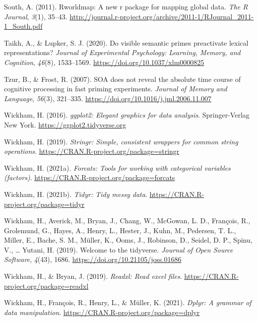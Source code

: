 \documentclass[
  english,
  man,floatsintext]{apa6}
\newlength{\cslhangindent}
\newlength{\cslentryspacingunit} %
\newenvironment{CSLReferences}[2] %
 {%
  \setlength{\parindent}{0pt}
  \ifodd #1
  \let\oldpar\par
  \def\par{\hangindent=\cslhangindent\oldpar}
  \fi
  \setlength{\parskip}{#2\cslentryspacingunit}
 }%
 {}
\begin{document}
\begin{CSLReferences}{1}{0}
\leavevmode{}%
South, A. (2011). Rworldmap: A new r package for mapping global data. \emph{The R Journal}, \emph{3}(1), 35--43. \url{http://journal.r-project.org/archive/2011-1/RJournal_2011-1_South.pdf}

\leavevmode{}%
Taikh, A., \& Lupker, S. J. (2020). Do visible semantic primes preactivate lexical representations? \emph{Journal of Experimental Psychology: Learning, Memory, and Cognition}, \emph{46}(8), 1533--1569. \url{https://doi.org/10.1037/xlm0000825}

\leavevmode{}%
Tzur, B., \& Frost, R. (2007). {SOA} does not reveal the absolute time course of cognitive processing in fast priming experiments. \emph{Journal of Memory and Language}, \emph{56}(3), 321--335. \url{https://doi.org/10.1016/j.jml.2006.11.007}

\leavevmode{}%
Wickham, H. (2016). \emph{ggplot2: Elegant graphics for data analysis}. Springer-Verlag New York. \url{https://ggplot2.tidyverse.org}

\leavevmode{}%
Wickham, H. (2019). \emph{Stringr: Simple, consistent wrappers for common string operations}. \url{https://CRAN.R-project.org/package=stringr}

\leavevmode{}%
Wickham, H. (2021a). \emph{Forcats: Tools for working with categorical variables (factors)}. \url{https://CRAN.R-project.org/package=forcats}

\leavevmode{}%
Wickham, H. (2021b). \emph{Tidyr: Tidy messy data}. \url{https://CRAN.R-project.org/package=tidyr}

\leavevmode{}%
Wickham, H., Averick, M., Bryan, J., Chang, W., McGowan, L. D., François, R., Grolemund, G., Hayes, A., Henry, L., Hester, J., Kuhn, M., Pedersen, T. L., Miller, E., Bache, S. M., Müller, K., Ooms, J., Robinson, D., Seidel, D. P., Spinu, V., \ldots{} Yutani, H. (2019). Welcome to the {tidyverse}. \emph{Journal of Open Source Software}, \emph{4}(43), 1686. \url{https://doi.org/10.21105/joss.01686}

\leavevmode{}%
Wickham, H., \& Bryan, J. (2019). \emph{Readxl: Read excel files}. \url{https://CRAN.R-project.org/package=readxl}

\leavevmode{}%
Wickham, H., François, R., Henry, L., \& Müller, K. (2021). \emph{Dplyr: A grammar of data manipulation}. \url{https://CRAN.R-project.org/package=dplyr}


\end{CSLReferences}
\end{document}
